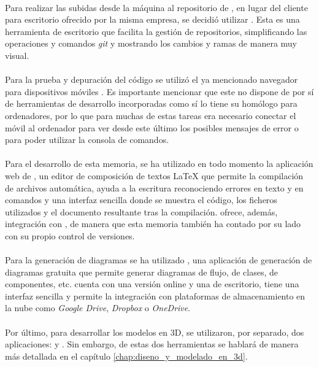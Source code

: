 \documentclass{subfiles}
\begin{document}
        \paragraph{}
        Para realizar las subidas desde la máquina al repositorio de \github, en lugar del cliente para escritorio ofrecido por la misma empresa, se decidió utilizar \gitkraken \cite{web:gitkraken}. Esta es una herramienta de escritorio que facilita la gestión de repositorios, simplificando las operaciones y comandos \textit{git} y mostrando los cambios y ramas de manera muy visual.

        \paragraph{}
        Para la prueba y depuración del código se utilizó el ya mencionado navegador \googlechrome para dispositivos móviles \cite{web:googlechromeforandroid}. Es importante mencionar que este no dispone de por sí de herramientas de desarrollo incorporadas como sí lo tiene su homólogo para ordenadores, por lo que para muchas de estas tareas era necesario conectar el móvil al ordenador para ver desde este último los posibles mensajes de error o para poder utilizar la consola de comandos.

        \paragraph{}
        Para el desarrollo de esta memoria, se ha utilizado en todo momento la aplicación web de \overleaf \cite{web:overleaf}, un editor de composición de textos \LaTeX \xspace que permite la compilación de archivos automática, ayuda a la escritura reconociendo errores en texto y en comandos y una interfaz sencilla donde se muestra el código, los ficheros utilizados y el documento resultante tras la compilación. \overleaf ofrece, además, integración con \github, de manera que esta memoria también ha contado por su lado con su propio control de versiones.

        \paragraph{}
        Para la generación de diagramas se ha utilizado \drawio \cite{web:drawio}, una aplicación de generación de diagramas gratuita que permite generar diagramas de flujo, de clases, de componentes, etc. \drawio cuenta con una versión online y una de escritorio, tiene una interfaz sencilla y permite la integración con plataformas de almacenamiento en la nube como \textit{Google Drive}, \textit{Dropbox} o \textit{OneDrive}.

        \paragraph{}
        Por último, para desarrollar los modelos en 3D, se utilizaron, por separado, dos aplicaciones: \makehuman \cite{web:makehuman} y \blender \cite{web:blender}. Sin embargo, de estas dos herramientas se hablará de manera más detallada en el capítulo \ref{chap:diseno_y_modelado_en_3d}.
        
\end{document}
